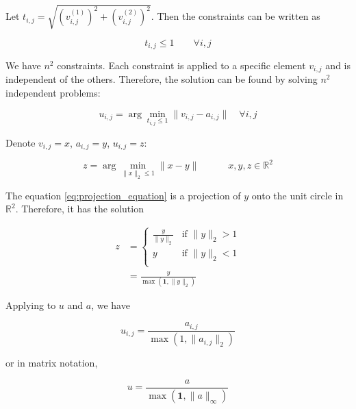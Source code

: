 Let $t_{i,j} = \sqrt{(v_{i,j}^{(1)})^2 + (v_{i,j}^{(2)})^2}$.
Then the constraints can be written as

\begin{equation}
    t_{i,j} \leq 1  \quad  \quad  \forall i, j
\end{equation}



We have $n^2$ constraints.
Each constraint is applied to a specific element $v_{i,j}$ and is independent of the others.
Therefore, the solution can be found by solving $n^2$ independent problems:

\begin{equation}
u_{i,j} = \arg \min_{t_{i,j} \leq 1} \| v_{i,j} - a_{i,j} \|  \quad \forall i, j
\end{equation}

Denote $v_{i,j} = x$, $a_{i,j} = y$, $u_{i,j} = z$:

\begin{equation}
    z = \arg \min_{\| x \|_2 \leq 1} \|x - y\| \quad \quad \quad x, y, z \in \mathbb{R}^2
    \label{eq:projection_equation}
\end{equation}

The equation \cref{eq:projection_equation} is a 
projection of $y$ onto the unit circle in $\mathbb{R}^2$.
Therefore, it has the solution


\begin{equation}
    \begin{aligned}
    z & =
    \begin{cases}
        \frac{y}{\|y\|_2} & \text{if } \|y\|_2 > 1 \\
        y & \text{if } \|y\|_2 < 1 \\
    \end{cases} \\
    & = \frac{y}{\max(\mathbf{1}, \|y\|_2)}
    \end{aligned}
\end{equation}



Applying to $u$ and $a$, we have

\begin{equation}
    u_{i,j} = \frac{a_{i,j}}{\max(1, \|a_{i,j}\|_2)}
\end{equation}

or in matrix notation,

\begin{equation}
    u = \frac{a}{\max(\mathbf{1}, \|a\|_\infty)}
\end{equation}

